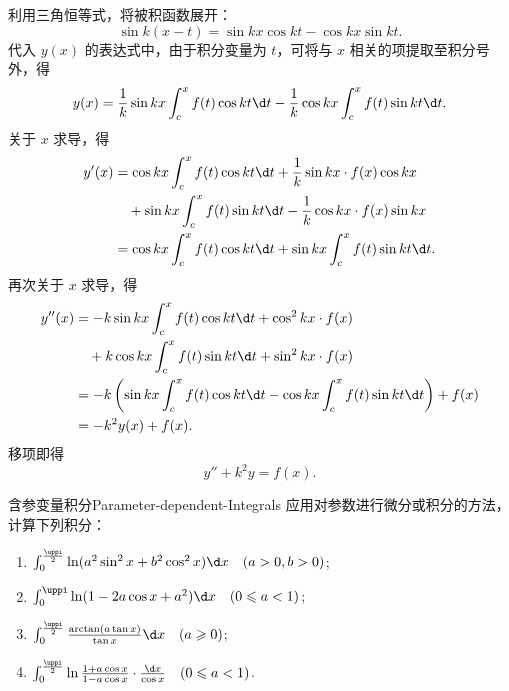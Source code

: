 \begin{myproof}
    利用三角恒等式，将被积函数展开：
    \begin{equation}
        \sin k(x - t) = \sin kx \cos kt - \cos kx \sin kt.
    \end{equation}
    代入 $y(x)$ 的表达式中，由于积分变量为 $t$，可将与 $x$ 相关的项提取至积分号外，得
    \begin{equation}
        y(x) = \frac{1}{k} \sin kx \int_{c}^{x} f(t) \cos kt \d t - \frac{1}{k} \cos kx \int_{c}^{x} f(t) \sin kt \d t.
    \end{equation}
    关于 $x$ 求导，得
    \begin{equation}
        \begin{aligned}
            y'(x) & = \cos kx \int_{c}^{x} f(t) \cos kt \d t + \frac{1}{k} \sin kx \cdot f(x) \cos kx       \\
                  & \quad + \sin kx \int_{c}^{x} f(t) \sin kt \d t - \frac{1}{k} \cos kx \cdot f(x) \sin kx \\
                  & = \cos kx \int_{c}^{x} f(t) \cos kt \d t + \sin kx \int_{c}^{x} f(t) \sin kt \d t.
        \end{aligned}
    \end{equation}
    再次关于 $x$ 求导，得
    \begin{equation}
        \begin{aligned}
            y''(x) & = -k \sin kx \int_{c}^{x} f(t) \cos kt \d t + \cos^2 kx \cdot f(x)                                         \\
                   & \quad + k \cos kx \int_{c}^{x} f(t) \sin kt \d t + \sin^2 kx \cdot f(x)                                    \\
                   & = -k \left( \sin kx \int_{c}^{x} f(t) \cos kt \d t - \cos kx \int_{c}^{x} f(t) \sin kt \d t \right) + f(x) \\
                   & = -k^2 y(x) + f(x).
        \end{aligned}
    \end{equation}
    移项即得
    \begin{equation}
        y'' + k^2 y = f(x).
    \end{equation}
\end{myproof}

\begin{problem}{含参变量积分}{Parameter-dependent-Integrals}
    应用对参数进行微分或积分的方法，计算下列积分：
    \begin{enumerate}
        \item $\int_0^{\frac{\uppi}{2}} \ln(a^2 \sin^2 x + b^2 \cos^2 x) \d x \quad (a > 0, b > 0)$;
        \item $\int_0^{\uppi} \ln(1 - 2a \cos x + a^2) \d x \quad (0 \leqslant a < 1)$;
        \item $\int_0^{\frac{\uppi}{2}} \frac{\arctan(a \tan x)}{\tan x} \d x \quad (a \geqslant 0)$;
        \item $\int_0^{\frac{\uppi}{2}} \ln \frac{1 + a \cos x}{1 - a \cos x} \cdot \frac{\d x}{\cos x} \quad (0 \leqslant a < 1)$.
    \end{enumerate}
\end{problem}

